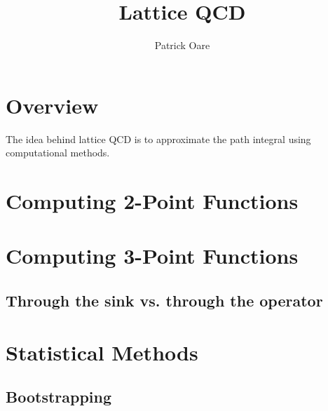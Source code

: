 \documentclass[11pt, oneside]{article}   	%
\title{Lattice QCD}
\author{Patrick Oare}
\date{}							%
\theoremstyle{definition}
\begin{document}
\maketitle

\section*{Overview}

The idea behind lattice QCD is to approximate the path integral using computational methods. 

\section*{Computing 2-Point Functions}

\section*{Computing 3-Point Functions}

\subsection*{Through the sink vs. through the operator}

\section*{Statistical Methods}

\subsection*{Bootstrapping}
\end{document}
